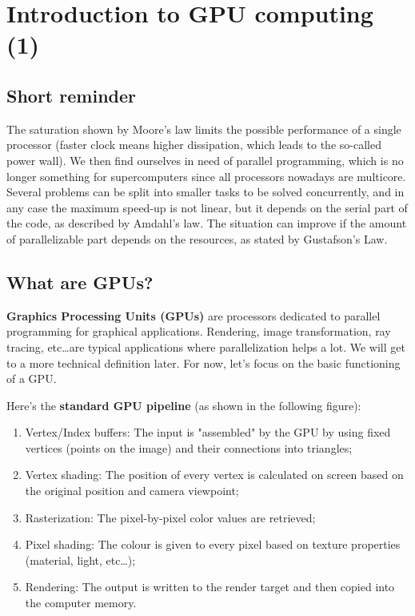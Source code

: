 \section{Introduction to GPU computing (1)}

\subsection{Short reminder}
The saturation shown by Moore's law limits the possible performance of a single processor (faster clock means higher dissipation, which leads to the so-called power wall). We then find ourselves in need of parallel programming, which is no longer something for supercomputers since all processors nowadays are multicore. Several problems can be split into smaller tasks to be solved concurrently, and in any case the maximum speed-up is not linear, but it depends on the serial part of the code, as described by Amdahl's law. The situation can improve if the amount of parallelizable part depends on the resources, as stated by Gustafson's Law.

\subsection{What are GPUs?}

\textbf{Graphics Processing Units (GPUs)} are processors dedicated to parallel programming for graphical applications. Rendering, image transformation, ray tracing, etc\dots are typical applications where parallelization helps a lot. We will get to a more technical definition later. For now, let's focus on the basic functioning of a GPU. 

Here's the \textbf{standard GPU pipeline} (as shown in the following figure):
\begin{enumerate}
    \item Vertex/Index buffers: The input is "assembled" by the GPU by using fixed vertices (points on the image) and their connections into triangles;
    \item Vertex shading: The position of every vertex is calculated on screen based on the original position and camera viewpoint;
    \item Rasterization: The pixel-by-pixel color values are retrieved;
    \item Pixel shading: The colour is given to every pixel based on texture properties (material, light, etc\dots);
    \item Rendering: The output is written to the render target and then copied into the computer memory.
\end{enumerate}

